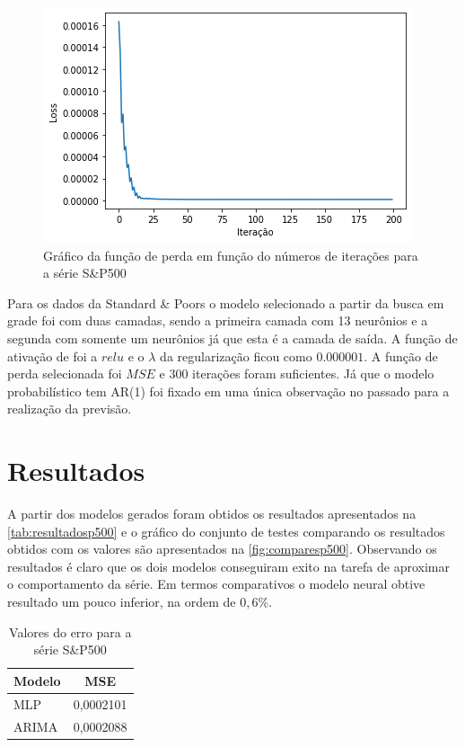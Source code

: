 \documentclass[
    12pt,
    oneside,
    a4paper,
    english,
    brazil
]{abntex2}
\begin{document}
\begin{figure}[ht]
    \centering
    \caption{Gráfico da função de perda em  função do números de iterações para
    a série S\&P500}\label{fig:iter_sp500_overfit}
    \includegraphics[width=.5\linewidth]{images/sp500_overfit_iter.png}
\end{figure}

Para os dados  da Standard \& Poors  o modelo selecionado a partir  da busca em
grade  foi com  duas camadas,  sendo a  primeira camada  com 13  neurônios e  a
segunda com somente um  neurônios já que esta é a camada de  saída. A função de
ativação de foi a $relu$ e  o $\lambda$ da regularização ficou como $0.000001$.
A função de  perda selecionada foi $MSE$ e 300  iterações foram suficientes. Já
que  o modelo  probabilístico  tem AR(1)  foi fixado  em  uma única  observação
no passado para a realização da previsão.

\chapter{Resultados}\label{chap:result}

A  partir  dos  modelos  gerados   foram  obtidos  os  resultados  apresentados
na   \autoref{tab:resultadosp500}   e  o   gráfico   do   conjunto  de   testes
comparando  os   resultados  obtidos  com   os  valores  são   apresentados  na
\autoref{fig:comparesp500}.  Observando  os  resultados  é claro  que  os  dois
modelos conseguiram exito  na tarefa de aproximar o comportamento  da série. Em
termos  comparativos o  modelo neural  obtive resultado  um pouco  inferior, na
ordem de $0,6\%$.

\begin{table}[ht]
    \centering
    \caption{Valores do erro para a série S\&P500}\label{tab:resultadosp500}
    \begin{tabular}{ll}
        \multicolumn{1}{c}{Modelo} & \multicolumn{1}{c}{MSE} \\
        \toprule
        MLP                        & 0,0002101               \\
        ARIMA                      & 0,0002088
    \end{tabular}
\end{table}
\end{document}
